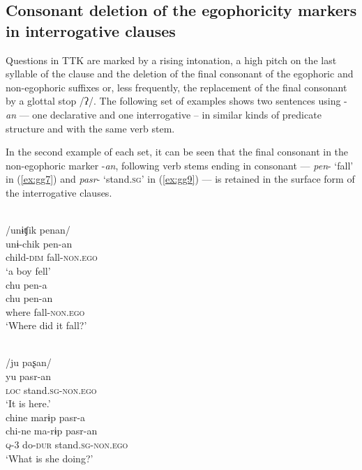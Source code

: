 \documentclass[output=paper]{langsci/langscibook}
\begin{document}
\subsection{Consonant deletion of the egophoricity markers in interrogative clauses}\label{s:gg1-2}

Questions in TTK are marked by a rising intonation, a high pitch on the last syllable of the clause and the deletion of the final consonant of the egophoric and non-egophoric suffixes or, less frequently, the replacement of the final consonant by a glottal stop /ʔ/. The following set of examples shows two sentences using -\textit{an} — one declarative and one interrogative – in similar kinds of predicate structure and with the same verb stem. 

In the second example of each set, it can be seen that the final consonant in the non-egophoric marker -\textit{an}, following verb stems ending in consonant — \textit{pen}- ‘fall’ in (\ref{ex:gg7}) and \textit{pasr}- ‘stand.\textsc{sg}’ in (\ref{ex:gg9}) — is retained in the surface form of the interrogative clauses.

\ea
    \ea \label{ex:gg6}
    \\
	    \glll /unɨʧik	penan/\\
	    unɨ-chik pen-an\\
        child-\textsc{dim} fall-\textsc{non.ego}\\
	    \glt ‘a boy fell’
\ex \label{ex:gg7}
    \\
	\glll chu	pen-a\\
	chu pen-an\\
    where fall-\textsc{non.ego}\\
	\glt ‘Where did it fall?’
	\z
\z

\ea
    \ea \label{ex:gg8}
    \\
	    \glll /ju	paʂan/\\
    	yu	pasr-an\\
        \textsc{loc} stand.\textsc{sg-non.ego}\\
	    \glt ‘It is here.’
\ex \label{ex:gg9}
    \\
	\glll chine	marɨp	pasr-a\\
	chi-ne	ma-rɨp pasr-an\\
    \textsc{q}-3 do-\textsc{dur} stand.\textsc{sg-non.ego}\\
	\glt ‘What is she doing?’
	\z
\z
\end{document}

